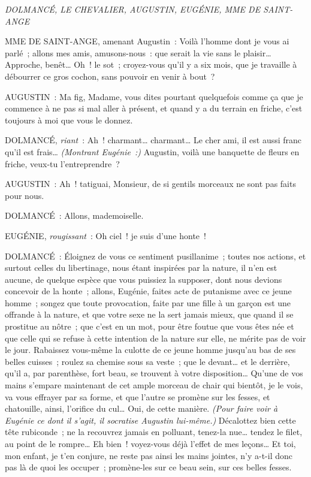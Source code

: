 \documentclass[french,twoside]{book} %
\begin{document}
\textit{DOLMANCÉ, LE CHEVALIER, AUGUSTIN, EUGÉNIE, MME DE SAINT-ANGE}\par
\noindent MME DE SAINT-ANGE, amenant Augustin : Voilà l’homme dont je vous ai parlé ; allons mes amis, amusons-nous : que serait la vie sans le plaisir… Approche, benêt… Oh ! le sot ; croyez-vous qu’il y a six mois, que je travaille à débourrer ce gros cochon, sans pouvoir en venir à bout ?\par
AUGUSTIN : Ma fig, Madame, vous dites pourtant quelquefois comme ça que je commence à ne pas si mal aller à présent, et quand y a du terrain en friche, c’est toujours à moi que vous le donnez.\par
DOLMANCÉ, {\itshape riant} : Ah ! charmant… charmant… Le cher ami, il est aussi franc qu’il est frais… {\itshape (Montrant Eugénie :)} Augustin, voilà une banquette de fleurs en friche, veux-tu l’entreprendre ?\par
AUGUSTIN : Ah ! tatiguai, Monsieur, de si gentils morceaux ne sont pas faits pour nous.\par
DOLMANCÉ : Allons, mademoiselle.\par
EUGÉNIE, {\itshape rougissant} : Oh ciel ! je suis d’une honte !\par
DOLMANCÉ : Éloignez de vous ce sentiment pusillanime ; toutes nos actions, et surtout celles du libertinage, nous étant inspirées par la nature, il n’en est aucune, de quelque espèce que vous puissiez la supposer, dont nous devions concevoir de la honte ; allons, Eugénie, faites acte de putanisme avec ce jeune homme ; songez que toute provocation, faite par une fille à un garçon est une offrande à la nature, et que votre sexe ne la sert jamais mieux, que quand il se prostitue au nôtre ; que c’est en un mot, pour être foutue que vous êtes née et que celle qui se refuse à cette intention de la nature sur elle, ne mérite pas de voir le jour. Rabaissez vous-même la culotte de ce jeune homme jusqu’au bas de ses belles cuisses ; roulez sa chemise sous sa veste ; que le devant… et le derrière, qu’il a, par parenthèse, fort beau, se trouvent à votre disposition… Qu’une de vos mains s’empare maintenant de cet ample morceau de chair qui bientôt, je le vois, va vous effrayer par sa forme, et que l’autre se promène sur les fesses, et chatouille, ainsi, l’orifice du cul… Oui, de cette manière. {\itshape (Pour faire voir à Eugénie ce dont il s’agit, il socratise Augustin lui-même.)} Décalottez bien cette tête rubiconde ; ne la recouvrez jamais en polluant, tenez-la nue… tendez le filet, au point de le rompre… Eh bien ! voyez-vous déjà l’effet de mes leçons… Et toi, mon enfant, je t’en conjure, ne reste pas ainsi les mains jointes, n’y a-t-il donc pas là de quoi les occuper ; promène-les sur ce beau sein, sur ces belles fesses.\par
\end{document}

